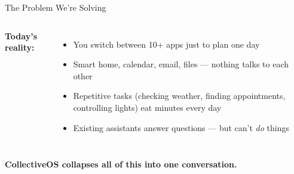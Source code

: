 \documentclass[aspectratio=169,11pt]{beamer}
\begin{document}
\begin{frame}{The Problem We're Solving}
  \vspace{0.6em}
  \begin{columns}[T]
    {\color{accentcol}\bfseries Today's reality:}
    \begin{itemize}\small
      \item You switch between 10+ apps just to plan one day
      \item Smart home, calendar, email, files — nothing talks to each other
      \item Repetitive tasks (checking weather, finding appointments,
            controlling lights) eat minutes every day
      \item Existing assistants answer questions — but can't \emph{do} things
    \end{itemize}

  \end{columns}
  \vspace{0.5em}
  \begin{center}
    {\small\bfseries\color{highlight}
      CollectiveOS collapses all of this into one conversation.}
  \end{center}
\end{frame}
\end{document}

